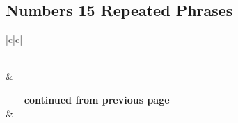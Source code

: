 \subsection{Numbers 15 Repeated Phrases}


\normalsize
 
\begin{center}
\begin{longtable}{|c|c|}
\caption[Numbers 15 Repeated Phrases]{Numbers 15 Repeated Phrases}\label{table:Repeated Phrases Numbers 15} \\
\hline {} &  \\ \hline 
\endfirsthead
 
{{\bfseries \tablename\ \thetable{} -- continued from previous page}} \\  
\hline {} &  \\ \hline 
\endhead
 

\end{longtable}
\end{center}
